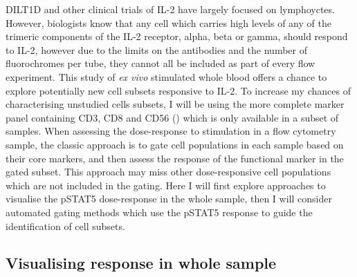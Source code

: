 DILT1D and other clinical trials of IL-2 have largely focused on lymphoyctes. %
However, biologists know that any cell which carries high levels of any of the trimeric components of the IL-2 receptor, alpha, beta or gamma,
should respond to IL-2, however due to the limits on the antibodies and the number of fluorochromes per tube,
they cannot all be included as part of every flow experiment.  
This study of \emph{ex vivo} stimulated whole blood offers a chance to explore potentially new cell subsets responsive to IL-2.
To increase my chances of characterising unstudied cells subsets, I will be using the more complete marker panel containing CD3, CD8
and CD56 () which is only available in a subset of samples.
When assessing the dose-response to stimulation in a flow cytometry sample,
the classic approach is to gate cell populations in each sample based on their core markers,
and then assess the response of the functional marker in the gated subset.
This approach may miss other dose-responsive cell populations which are not included in the gating.
Here I will first explore approaches to visualise the pSTAT5 dose-response in the whole sample,
then I will consider automated gating methods which use the pSTAT5 response to guide the identification of cell subsets.




\subsection{Visualising response in whole sample}

